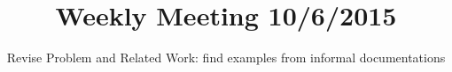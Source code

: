 \documentclass{sig-alternate}
\begin{document}



\title{Weekly Meeting 10/6/2015} %
\subtitle{Revise Problem and Related Work: find examples from informal documentations}
%
%

%
%
%

\maketitle







%

 
\end{document}

